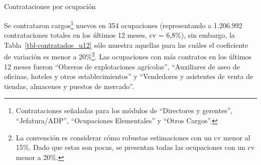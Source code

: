 \documentclass[
  14pt,
]{article}
\makeatletter
\let\oldsubparagraph\subparagraph
\renewcommand{\subparagraph}{
    \@ifstar
      \xxxSubParagraphStar
      \xxxSubParagraphNoStar
  }
\newcommand{\xxxSubParagraphStar}[1]{\oldsubparagraph*{#1}\mbox{}}
\newcommand{\xxxSubParagraphNoStar}[1]{\oldsubparagraph{#1}\mbox{}}
\makeatother
\begin{document}
\FloatBarrier

\begin{table}

\caption{\label{tbl-contratos_totales}Porcentaje de empresas que
contrataron en los últimos 12 meses por sector económico}


\end{table}%

\FloatBarrier

\subparagraph{Contrataciones por
ocupación}\label{contrataciones-por-ocupaciuxf3n}

Se contrataron cargos\footnote{Contrataciones señaladas para los módulos
  de ``Directores y gerentes'', ``Jefatura/ADP'', ``Ocupaciones
  Elementales'' y ``Otros Cargos''.} nuevos en 354 ocupaciones
(representando a 1.206.992 contrataciones totales en los últimos 12
meses, cv = 6,8\%), sin embargo, la Tabla~\ref{tbl-contratados_u12} sólo
muestra aquellas para las cuáles el coeficiente de variación es menor a
20\%\footnote{La convención es considerar cómo robustas estimaciones con
  un cv menor al 15\%. Dado que estas son pocas, se presentan todas las
  ocupaciones con un cv menor a 20\%.}. Las ocupaciones con más
contratos en los últimos 12 meses fueron ``Obreros de explotaciones
agrícolas'', ``Auxiliares de aseo de oficinas, hoteles y otros
establecimientos'' y ``Vendedores y asistentes de venta de tiendas,
almacenes y puestos de mercado''.
\end{document}
